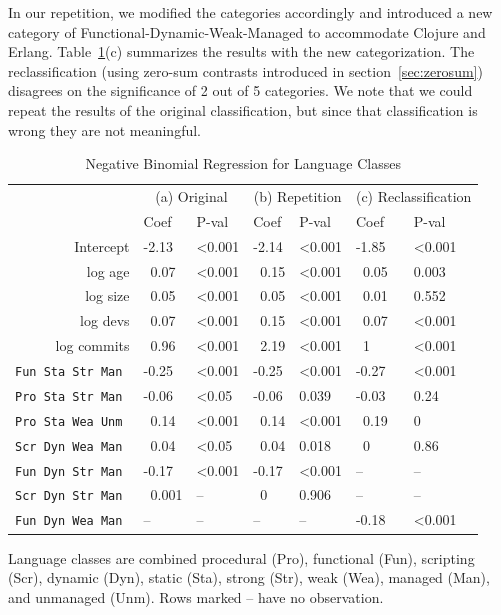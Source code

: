 \documentclass[acmsmall]{acmart}
\newcommand{\clojure}{{\sf  Clojure}\xspace}
\newcommand{\erlang}{{\sf  Erlang}\xspace}
\newcommand{\tabledesc}[1]{\begin{spacing}{.5}{\footnotesize #1}\end{spacing}}
\begin{document}
In our repetition, we modified the categories accordingly and introduced a
new category of {Functional-Dynamic-Weak-Managed} to accommodate \clojure
and \erlang. Table~\ref{t5}(c) summarizes the results with the new
categorization. The reclassification (using zero-sum contrasts introduced in
section~\ref{sec:zerosum}) disagrees on the significance of 2 out of 5
categories.  We note that we could repeat the results of the original
classification, but since that classification is wrong they are not
meaningful.


\begin{table}[h!]\center
\caption{Negative Binomial Regression for Language Classes}
\begin{tabular}{@{}r||ll||ll|ll@{}}  \hline
\rule{0pt}{3ex} & \multicolumn{2}{c||}{\normalsize (a) Original} & \multicolumn{2}{c}{\normalsize (b) Repetition} & \multicolumn{2}{c}{\normalsize (c) Reclassification}\\[1mm] & Coef & P-val & Coef & P-val & Coef & P-val \\ \hline
Intercept           & -2.13 & <0.001 &-2.14 &  <0.001 &  -1.85 &  <0.001 \\ 
            log age & ~0.07 & <0.001 &~0.15 &  <0.001 &  ~0.05 &  0.003 \\ 
           log size & ~0.05 & <0.001 &~0.05 &  <0.001 &  ~0.01 &  0.552 \\ 
           log devs & ~0.07 & <0.001 &~0.15 &  <0.001 &  ~0.07 &  <0.001 \\ 
        log commits & ~0.96 & <0.001 &~2.19 &  <0.001 &  ~1    &  <0.001 \\    \hline\hline
\tt Fun Sta Str Man & -0.25 & <0.001 &-0.25 &  <0.001 &  -0.27 &  <0.001 \\ 
\tt Pro Sta Str Man & -0.06 &  <0.05 &-0.06 &   0.039 & \cellcolor{gray!25} -0.03 & \cellcolor{gray!25} 0.24 \\ 
\tt Pro Sta Wea Unm & ~0.14 & <0.001 &~0.14 &  <0.001 &  ~0.19 &  0 \\ 
\tt Scr Dyn Wea Man & ~0.04 &  <0.05 &~0.04 &  0.018  &\cellcolor{gray!25} ~0 & \cellcolor{gray!25} 0.86 \\ 
\tt Fun Dyn Str Man & -0.17 & <0.001 &-0.17 &  <0.001 &   -- &  -- \\ 
\tt Scr Dyn Str Man &~0.001 &     -- &   ~0 &   0.906 &   -- &  -- \\ 
\tt Fun Dyn Wea Man &    -- &     -- &   -- &      -- & -0.18 &  <0.001 \\  \hline
\end{tabular}\label{t5}
\medskip \tabledesc{Language classes are combined procedural (Pro),
  functional (Fun), scripting (Scr), dynamic (Dyn), static (Sta), strong
  (Str), weak (Wea), managed (Man), and unmanaged (Unm). Rows marked -- have
  no observation.}
\end{table}
\end{document}
